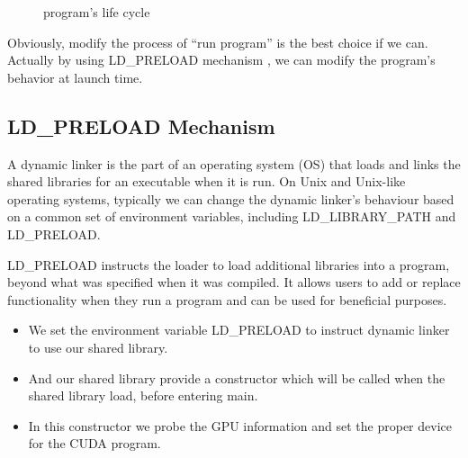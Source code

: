 \documentclass[a4paper,11pt]{article}
\begin{document}
\begin{figure}[h]
  \centering
{}
  \caption{program's life cycle}
  \label{ProgramLifeCycle}
\end{figure}

Obviously, modify the process of ``run program'' is the best choice if we can.
Actually by using LD\_PRELOAD mechanism , we can modify the program's behavior at launch time.

\subsection{LD\_PRELOAD Mechanism}
A dynamic linker is the part of an operating system (OS) that loads and links the shared libraries for an executable when it is run.
On Unix and Unix-like operating systems, typically we can change the dynamic linker's behaviour based on a common set of environment variables, including LD\_LIBRARY\_PATH and LD\_PRELOAD.

LD\_PRELOAD instructs the loader to load additional libraries into a program, beyond what was specified when it was compiled. It allows users to add or replace functionality when they run a program and can be used for beneficial purposes.

\begin{itemize}
  \item We set the environment variable LD\_PRELOAD to instruct dynamic linker to use our shared library.
  \item And our shared library provide a constructor which will be called when the shared library load, before entering main.
  \item In this constructor we probe the GPU information and set the proper device for the CUDA program.
\end{itemize}
\end{document}
